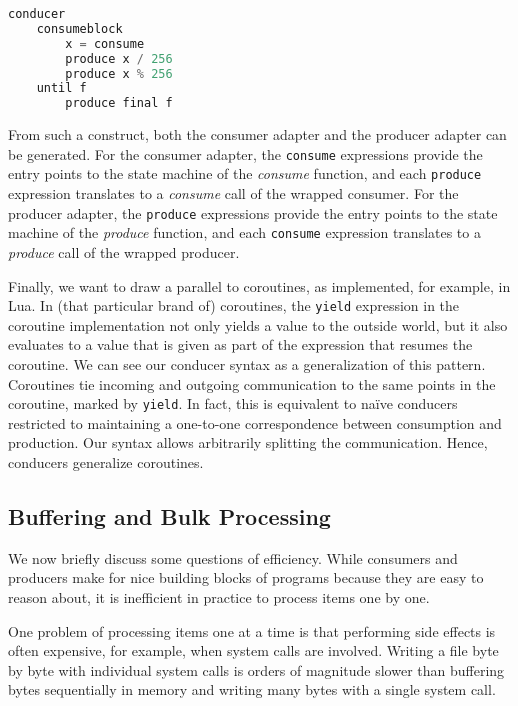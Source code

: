 \documentclass[sigplan,screen,10pt,review]{acmart}
\begin{document}
\begin{lstlisting}[language=Python]
conducer
    consumeblock
        x = consume
        produce x / 256
        produce x % 256
    until f
        produce final f
\end{lstlisting}

From such a construct, both the consumer adapter and the producer adapter can be generated. For the consumer adapter, the \texttt{consume} expressions provide the entry points to the state machine of the \textit{consume} function, and each \texttt{produce} expression translates to a \textit{consume} call of the wrapped consumer. For the producer adapter, the \texttt{produce} expressions provide the entry points to the state machine of the \textit{produce} function, and each \texttt{consume} expression translates to a \textit{produce} call of the wrapped producer.


Finally, we want to draw a parallel to coroutines\cite{moura2009revisiting}, as implemented, for example, in Lua\cite{ierusalimschy2006programming}. In (that particular brand of) coroutines, the \texttt{yield} expression in the coroutine implementation not only yields a value to the outside world, but it also evaluates to a value that is given as part of the expression that resumes the coroutine. We can see our conducer syntax as a generalization of this pattern. Coroutines tie incoming and outgoing communication to the same points in the coroutine, marked by \texttt{yield}. In fact, this is equivalent to naïve conducers restricted to maintaining a one-to-one correspondence between consumption and production. Our syntax allows arbitrarily splitting the communication. Hence, conducers generalize coroutines.

\subsection{Buffering and Bulk Processing}\label{bulk}

We now briefly discuss some questions of efficiency. While consumers and producers make for nice building blocks of programs because they are easy to reason about, it is inefficient in practice to process items one by one.

One problem of processing items one at a time is that performing side effects is often expensive, for example, when system calls are involved. Writing a file byte by byte with individual system calls is orders of magnitude slower than buffering bytes sequentially in memory and writing many bytes with a single system call.
\end{document}
